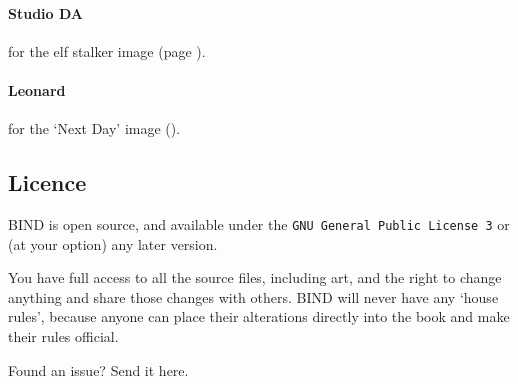 \begin{multicols}{2}
\paragraph{Studio DA}
for the elf stalker image
(page \pageref{Studio_DA/elf_stalker}).

\paragraph{Leonard}
for the `Next Day' image ().

\subsection*{Licence}

BIND is open source, and available under the {\tt GNU General Public License 3} or (at your option) any later version.

You have full access to all the source files, including art, and the right to change anything and share those changes with others.
BIND will never have any `house rules', because anyone can place their alterations directly into the book and make their rules official.

\begin{center}
  
  Found an issue?
  Send it here.
\end{center}

\end{multicols}
